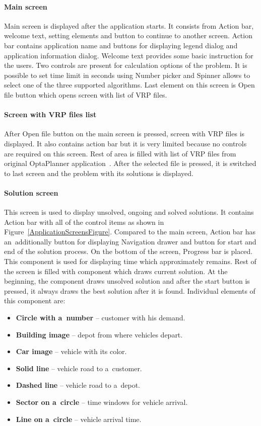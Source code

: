 \paragraph{Main screen}
Main screen is displayed after the application starts. It consists from Action bar, welcome text, setting elements
and button to continue to another screen. Action bar contains application name and buttons for displaying legend dialog
and application information dialog. Welcome text provides some basic instruction for the users. Two controls are present
for calculation options of the problem. It is possible to set time limit in seconds using Number picker and Spinner
allows to select one of the three supported algorithms. Last element on this screen is Open file button which opens
screen with list of VRP files.

\paragraph{Screen with VRP files list} After Open file button on the main screen is pressed, screen with VRP files is
displayed. It also contains action bar but it is very limited because no controls are required on this screen. Rest of
area is filled with list of VRP files from original OptaPlanner application~\cite{OptaPlannerDistribution}. After the
selected file is pressed, it is switched to last screen and the problem with its solutions is displayed.

\paragraph{Solution screen}
This screen is used to display unsolved, ongoing and solved solutions. It contains Action bar with all of the control
items as shown in Figure~\ref{ApplicationScreensFigure}. Compared to the main screen, Action bar has an~additionally
button for displaying Navigation drawer and button for start and end of the solution process. On the bottom of the
screen, Progress bar is placed. This component is used for displaying time which approximately remains. Rest of the
screen is filled with component which draws current solution. At the beginning, the component draws unsolved solution
and after the start button is pressed, it always draws the best solution after it is found. Individual elements of this
component are:

\begin{itemize}
  \item \textbf{Circle with a~number} -- customer with his demand.
  \item \textbf{Building image} -- depot from where vehicles depart.
  \item \textbf{Car image} -- vehicle with its color.
  \item \textbf{Solid line} -- vehicle road to a~customer.
  \item \textbf{Dashed line} -- vehicle road to a~depot.
  \item \textbf{Sector on a~circle} -- time windows for vehicle arrival.
  \item \textbf{Line on a~circle} -- vehicle arrival time.
\end{itemize}

